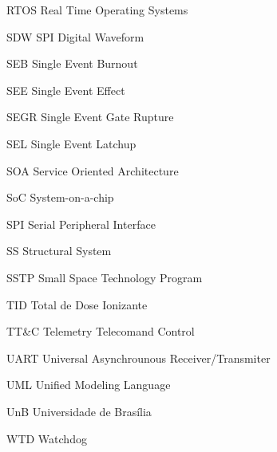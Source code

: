 \begin{siglas}
\item[RTOS	] Real Time Operating Systems
\item[SDW	] SPI Digital Waveform
\item[SEB	] Single Event Burnout
\item[SEE	] Single Event Effect
\item[SEGR	] Single Event Gate Rupture
\item[SEL	] Single Event Latchup	 
\item[SOA	] Service Oriented Architecture
\item[SoC	] System-on-a-chip
\item[SPI	] Serial Peripheral Interface 
\item[SS	] Structural System
\item[SSTP	] Small Space Technology Program
\item[TID	] Total de Dose Ionizante
\item[TT\&C	] Telemetry Telecomand Control
\item[UART	] Universal Asynchrounous Receiver/Transmiter
\item[UML	] Unified Modeling Language
\item[UnB	] Universidade de Brasília
\item[WTD	] Watchdog
\end{siglas}
